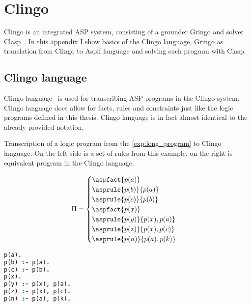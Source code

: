 \chapter{Clingo}\label{sec:clingo}

Clingo is an integrated ASP system, consisting of a grounder Gringo and solver
Clasp~\cite{aspEasy2016}.
In this appendix I show basics of the
Clingo language, Gringo as translation from Clingo to Aspif language and
solving such program with Clasp.

\section{Clingo language}\label{sec:clingo_language}
Clingo language~\cite{gebser2019potassco} is used for transcribing ASP programs
in the Clingo system.
Clingo language does allow for facts, rules and constraints just like
the logic programs defined in this thesis. Clingo language is in fact
almost identical to the already provided notation.

\begin{example}
    Transcription of a logic program from the \cref{exp:long_program} to Clingo language.
    On the left side is a set of rules from this example,
    on the right is equivalent program in the Clingo language.

    \begin{minipage}{.4\textwidth}
    \begin{equation*}
        \Pi =
            \begin{cases}
                \aspfact{p(a)}\\
                \asprule{p(b)}{p(a)}\\
                \asprule{p(c)}{p(b)}\\
                \aspfact{p(x)}\\
                \asprule{p(y)}{p(x), p(a)}\\
                \asprule{p(z)}{p(x), p(c)}\\
                \asprule{p(n)}{p(a), p(k)}\\
            \end{cases}
    \end{equation*}
    \end{minipage}
    \hfill
    \begin{minipage}{.4\textwidth}
        \vspace{1em}
        \begin{lstlisting}[language=Prolog, numbers=none, basicstyle=\linespread{1.25}\normalsize]
p(a).
p(b) :- p(a).
p(c) :- p(b).
p(x).
p(y) :- p(x), p(a).
p(z) :- p(x), p(c).
p(n) :- p(a), p(k).
\end{lstlisting}
    \end{minipage}
\end{example}

